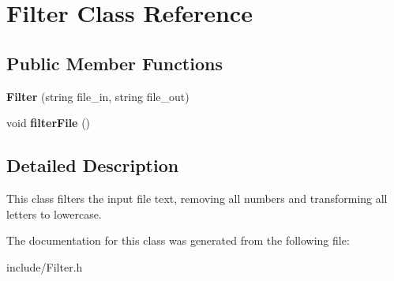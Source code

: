 \hypertarget{classFilter}{}\section{Filter Class Reference}
\label{classFilter}
\subsection*{Public Member Functions}
\begin{DoxyCompactItemize}
\item 
\mbox{\label{classFilter_a06e2b7f349e799df1d5c04f4256003e4}} 
{\bfseries Filter} (string file\+\_\+in, string file\+\_\+out)
\item 
\mbox{\label{classFilter_a0c8b838721a57d2e7fed2432543c03eb}} 
void {\bfseries filter\+File} ()
\end{DoxyCompactItemize}


\subsection{Detailed Description}
This class filters the input file text, removing all numbers and transforming all letters to lowercase. 

The documentation for this class was generated from the following file\+:\begin{DoxyCompactItemize}
\item 
include/Filter.\+h\end{DoxyCompactItemize}
